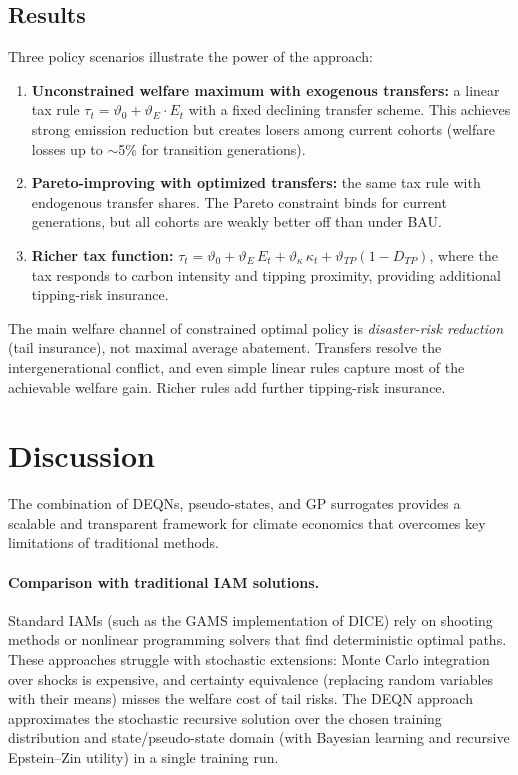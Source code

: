 \documentclass[11pt,a4paper]{report}
\begin{document}
\subsection{Results}

Three policy scenarios illustrate the power of the approach:
\begin{enumerate}[itemsep=2pt]
\item \textbf{Unconstrained welfare maximum with exogenous transfers:}  a linear tax rule $\tau_t = \vartheta_0 + \vartheta_E \cdot E_t$ with a fixed declining transfer scheme.  This achieves strong emission reduction but creates losers among current cohorts (welfare losses up to $\sim$5\% for transition generations).
\item \textbf{Pareto-improving with optimized transfers:}  the same tax rule with endogenous transfer shares.  The Pareto constraint binds for current generations, but all cohorts are weakly better off than under BAU.
\item \textbf{Richer tax function:}  $\tau_t = \vartheta_0 + \vartheta_E\,E_t + \vartheta_\kappa\,\kappa_t + \vartheta_{TP}(1 - D_{TP})$, where the tax responds to carbon intensity and tipping proximity, providing additional tipping-risk insurance.
\end{enumerate}

\begin{keyinsightbox}
The main welfare channel of constrained optimal policy is \emph{disaster-risk reduction} (tail insurance), not maximal average abatement.  Transfers resolve the intergenerational conflict, and even simple linear rules capture most of the achievable welfare gain.  Richer rules add further tipping-risk insurance.
\end{keyinsightbox}

\section{Discussion}
\label{sec:climate_discussion}

The combination of DEQNs, pseudo-states, and GP surrogates provides a scalable and transparent framework for climate economics that overcomes key limitations of traditional methods.

\paragraph{Comparison with traditional IAM solutions.}
Standard IAMs (such as the GAMS implementation of DICE) rely on shooting methods or nonlinear programming solvers that find deterministic optimal paths.  These approaches struggle with stochastic extensions: Monte Carlo integration over shocks is expensive, and certainty equivalence (replacing random variables with their means) misses the welfare cost of tail risks.  The DEQN approach approximates the stochastic recursive solution over the chosen training distribution and state/pseudo-state domain (with Bayesian learning and recursive Epstein--Zin utility) in a single training run.
\end{document}

